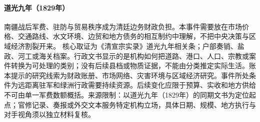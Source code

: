 \hypertarget{civic:EQ-1829-XINJIANG-FINANCE}{}\paragraph{道光九年（1829年）}南疆战后军费、驻防与贸易秩序成为清廷边务财政负担。本事件需要放在市场价格、交通路线、水文环境、边贸和地方债务的相互制约中理解，不把中央决策与区域经济割裂开来。 核心取证为《清宣宗实录》道光九年相关条；户部奏销、盐政、河工或海关档案。行政文书显示的是机构如何把道路、港口、人口、宗教或案件转换为可处理的类别；没有后续县档或物质证据，不能由分类推定实际生活。账本提示的研究线索为财政账册、市场网络、灾害环境与区域经济研究。事件所处条件为远距离驻军和绿洲行政需要持续资源。后续变化应限于预算、实收和地方供给不可由单一军费数额概括。来源限制：以道光九年（1829年）的同期文书为定位起点；官修记录、奏报或外交文本服务特定机构立场，具体日期、规模、地方执行与对手视角须以独立材料复核。
